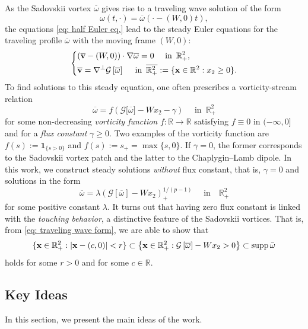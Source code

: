 \documentclass[11pt]{amsart}
\theoremstyle{definition}
\theoremstyle{definition}
\numberwithin{equation}{section}
\newcommand{\set}[1]{\{#1\}}
\newcommand{\supp}{{\mathrm{supp}}\,}
\newcommand{\0}{\emptyset}
\newcommand{\omg}{\omega}
\newcommand{\bfv}{{\bf v}}
\newcommand{\bfx}{{\bf x}}
\newcommand{\bbR}{\mathbb R}
\newcommand{\calG}{\mathcal G}
\newcommand{\q}{\mbox{ }}
\newcommand{\qd}{\quad}
\begin{document}
	As the Sadovskii vortex $\overline{\omg}$ gives rise to a traveling wave solution of the form 
	$$
	\omg(t,\cdot)=\overline{\omg}(\cdot-(W,0)t),
	$$
	the equations \eqref{eq: half Euler eq.} lead to the steady Euler equations for the traveling profile $\overline{\omg}$ with the moving frame $(W,0)$: 
	\begin{equation}\label{eq: steady Euler eq.}
		\left\{
		\begin{aligned}
			&(\overline{\bfv}-(W,0)) \cdot \nabla \overline{\omg} = 0 \quad \mbox{ in } \, \bbR^2_+,\\
			&\overline{\bfv} = \nabla^\perp \calG \left[\overline{\omg}\right] \quad \mbox{ in } \, \overline{\bbR^2_+}:=\{\bfx\in\bbR^2: x_2\geq0\}.
		\end{aligned}
		\right.
	\end{equation} To find solutions to this steady equation, one often prescribes a vorticity-stream relation
	\begin{equation}\label{eq_intro_vorticity}
		\overline{\omg} = f \left(\calG\big[\overline{\omg}\big]-Wx_2-\gamma \right)\quad \mbox{ in } \, \bbR^2_+
	\end{equation}
	for some non-decreasing \textit{vorticity function} $f:\bbR\to\bbR$ satisfying $f\equiv0$ in $(-\infty,0]$ and for a \textit{flux constant} $\gamma\geq0$.
	Two examples of the vorticity function are $f(s):=\mathbf{1}_{\set{s>0}}$ and $f(s):=s_+=\max\set{s,0}$.
	If $\gamma=0$,  the former corresponds to the Sadovskii vortex patch and the latter to the Chaplygin--Lamb dipole. 
	In this work, we construct steady solutions \emph{without} flux constant, that is, $\gamma = 0$ and solutions in the form 
	\begin{equation}\label{eq: traveling wave form}
		\overline{\omg}  =  \lambda \left(\calG\left[ \overline{\omg}\right] - Wx_2 \right)_+^{1/(p-1)}\qd\mbox{ in }\q\bbR^2_+
	\end{equation} for some positive constant $\lambda$.
	It turns out that having zero flux constant is linked with the \textit{touching behavior}, a distinctive feature of the Sadovskii vortices. That is, from \eqref{eq: traveling wave form}, we are able to show that 
	$$
	\{ \bfx \in \bbR^2_+: |\bfx-(c,0)| < r\}  \subset \left\{\bfx \in \bbR^2_+: \calG\left[ \overline{\omega}\right] - Wx_2>0\right\} \subset \supp \bar{\omega}
	$$
	holds for some $r > 0$ and for some $c\in\mathbb{R}$. 
	
	
	\subsection{Key Ideas} \label{sec_key}
	In this section, we present the main ideas of the work. 
	
\end{document}
